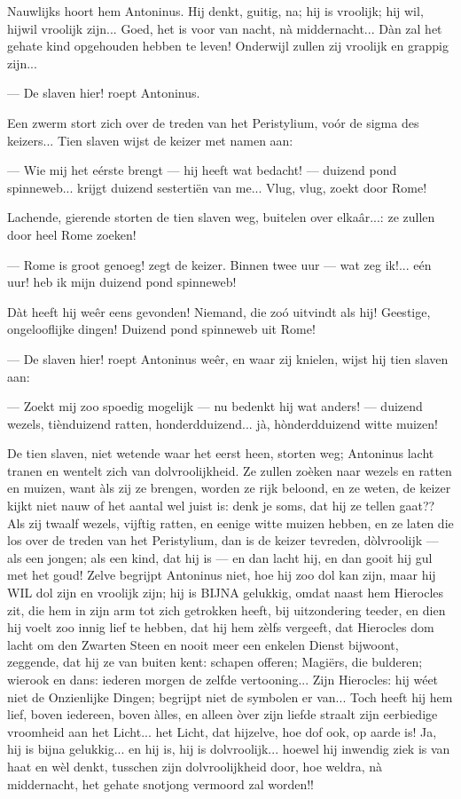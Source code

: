 \documentclass[a4paper, 12pt, oneside, dutch]{article}
\begin{document}
Nauwlijks hoort hem Antoninus. Hij denkt, guitig, na; hij is vroolijk; hij wil, hijwil vroolijk zijn... Goed, het is voor van nacht, nà middernacht... Dàn zal het gehate kind opgehouden hebben te leven! Onderwijl zullen zij vroolijk en grappig zijn...

--- De slaven hier! roept Antoninus.

Een zwerm stort zich over de treden van het Peristylium, voór de sigma des keizers... Tien slaven wijst de keizer met namen aan:

--- Wie mij het eérste brengt --- hij heeft wat bedacht! --- duizend pond spinneweb... krijgt duizend sestertiën van me... Vlug, vlug, zoekt door Rome!

Lachende, gierende storten de tien slaven weg, buitelen over elkaâr...: ze zullen door heel Rome zoeken!

--- Rome is groot genoeg! zegt de keizer. Binnen twee uur --- wat zeg ik!... eén uur! heb ik mijn duizend pond spinneweb!

Dàt heeft hij weêr eens gevonden! Niemand, die zoó uitvindt als hij! Geestige, ongelooflijke dingen! Duizend pond spinneweb uit Rome!

--- De slaven hier! roept Antoninus weêr, en waar zij knielen, wijst hij tien slaven aan:

--- Zoekt mij zoo spoedig mogelijk --- nu bedenkt hij wat anders! --- duizend wezels, tiènduizend ratten, honderdduizend... jà, hònderdduizend witte muizen!

De tien slaven, niet wetende waar het eerst heen, storten weg; Antoninus lacht tranen en wentelt zich van dolvroolijkheid. Ze zullen zoèken naar wezels en ratten en muizen, want àls zij ze brengen, worden ze rijk beloond, en ze weten, de keizer kijkt niet nauw of het aantal wel juist is: denk je soms, dat hij ze tellen gaat?? Als zij twaalf wezels, vijftig ratten, en eenige witte muizen hebben, en ze laten die los over de treden van het Peristylium, dan is de keizer tevreden, dòlvroolijk --- als een jongen; als een kind, dat hij is --- en dan lacht hij, en dan gooit hij gul met het goud! Zelve begrijpt Antoninus niet, hoe hij zoo dol kan zijn, maar hij WIL dol zijn en vroolijk zijn; hij is BIJNA gelukkig, omdat naast hem Hierocles zit, die hem in zijn arm tot zich getrokken heeft, bij uitzondering teeder, en dien hij voelt zoo innig lief te hebben, dat hij hem zèlfs vergeeft, dat Hierocles dom lacht om den Zwarten Steen en nooit meer een enkelen Dienst bijwoont, zeggende, dat hij ze van buiten kent: schapen offeren; Magiërs, die bulderen; wierook en dans: iederen morgen de zelfde vertooning... Zijn Hierocles: hij wéet niet de Onzienlijke Dingen; begrijpt niet de symbolen er van... Toch heeft hij hem lief, boven iedereen, boven àlles, en alleen òver zijn liefde straalt zijn eerbiedige vroomheid aan het Licht... het Licht, dat hijzelve, hoe dof ook, op aarde is! Ja, hij is bijna gelukkig... en hij is, hij is dolvroolijk... hoewel hij inwendig ziek is van haat en wèl denkt, tusschen zijn dolvroolijkheid door, hoe weldra, nà middernacht, het gehate snotjong vermoord zal worden!!
\end{document}
